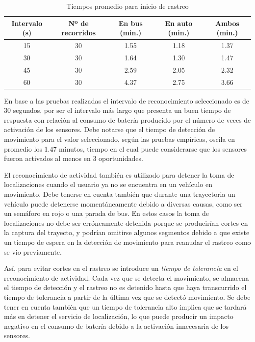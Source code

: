 \begin{table}[h]
  \centering
	\begin{tabular}{ccccc}
	\toprule
	Intervalo (s) & Nº de recorridos & En bus (min.) & En auto (min.) & Ambos (min.) \\
	\midrule
	15            & 30       & 1.55         & 1.18            & 1.37         \\
	30            & 30       & 1.64         & 1.30            & 1.47         \\
	45            & 30       & 2.59         & 2.05            & 2.32         \\
	60            & 30       & 4.37         & 2.75            & 3.66         \\
	\bottomrule
	\end{tabular}
  \caption{Tiempos promedio para inicio de rastreo}
  \label{tab:prom_intervalo_reconocimiento}
\end{table}

En base a las pruebas realizadas el intervalo de reconocimiento seleccionado es de 30 segundos, por ser el intervalo más largo que presenta un buen tiempo de respuesta con relación al consumo de batería producido por el número de veces de activación de los sensores. Debe notarse que el tiempo de detección de movimiento para el valor seleccionado, según las pruebas empíricas, oscila en promedio los 1.47 minutos, tiempo en el cual puede considerarse que los sensores fueron activados al menos en 3 oportunidades.

El reconocimiento de actividad también es utilizado para detener la toma de localizaciones cuando el usuario ya no se encuentra en un vehículo en movimiento. Debe tenerse en cuenta también que durante una trayectoria un vehículo puede detenerse momentáneamente debido a diversas causas, como ser un semáforo en rojo o una parada de bus. En estos casos la toma de localizaciones no debe ser erróneamente detenida porque se producirían cortes en la captura del trayecto, y podrían omitirse algunos segmentos debido a que existe un tiempo de espera en la detección de movimiento para reanudar el rastreo como se vio previamente.

Así, para evitar cortes en el rastreo se introduce un \emph{tiempo de tolerancia} en el reconocimiento de actividad. Cada vez que se detecta el movimiento, se almacena el tiempo de detección y el rastreo no es detenido hasta que haya transcurrido el tiempo de tolerancia a partir de la última vez que se detectó movimiento. Se debe tener en cuenta también que un tiempo de tolerancia alto implica que se tardará más en detener el servicio de localización, lo que puede producir un impacto negativo en el consumo de batería debido a la activación innecesaria de los sensores.

